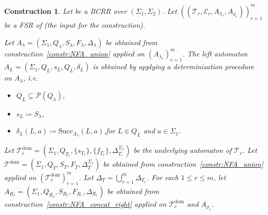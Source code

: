 \documentclass{article}
\newtheorem{construction}[definition]{Construction}
\begin{document}
	\begin{construction} \label{constr:two-step_bimachine}
		Let  be a BCRR over $(\Sigma_1, \Sigma_2)$.
		Let $((\mathcal{T}_r, \mathcal{E}_r, A_{\lambda_r}, A_{\rho_r}))_{r=1}^m$ be a FSR of  (the input for the construction).
		
		Let $A_\lambda = (\Sigma_1, Q_{\lambda}, S_{\lambda}, F_{\lambda}, \Delta_{\lambda})$ be obtained from construction~\ref{constr:NFA_union} applied on $(A_{\lambda_r})_{r=1}^m$.
		The left automaton $A_L = (\Sigma_1, Q_L, s_L, Q_L, \delta_L)$ is obtained by applying a determinization procedure on $A_\lambda$, i.e.
		\begin{itemize}
			\item \( Q_L \subseteq \mathcal{P}(Q_\lambda) \),
			\item \( s_L \coloneq S_\lambda \),
			\item \( \delta_L(L, a) \coloneq \mathrm{Succ}_{A_\lambda}(L, a) \),\quad for $L\in Q_L$ and $a\in \Sigma_1$.
		\end{itemize}

		Let $\mathcal{T}_r^\mathrm{dom} = (\Sigma_1, Q_{T_r}, \{ s_{T_r} \}, \{ f_{T_r} \}, \Delta_{T_r}^{\Sigma_1})$ be the underlying automaton of $\mathcal{T}_r$.
		Let $\mathcal{T}^\mathrm{dom} = (\Sigma_1, Q_T, S_T, F_T, \Delta_T^{\Sigma_1})$ be obtained from construction~\ref{constr:NFA_union} applied on $(\mathcal{T}_r^\mathrm{dom})_{r=1}^m$. 
		Let	$\Delta_T = \bigcup_{r=1}^m \Delta_{T_r}$.
		For each $1\le r\le m$, let $A_{R_r} = (\Sigma_1, Q_{R_r}, S_{R_r}, F_{R_r}, \Delta_{R_r})$ be obtained from construction~\ref{constr:NFA_concat_right} applied on $\mathcal{T}_r^\mathrm{dom}$ and $A_{\rho_r}$.
		

\end{construction}
\end{document}
